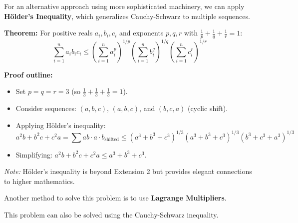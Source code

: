 \begin{remark}
For an alternative approach using more sophisticated machinery, we can apply \textbf{H\"older's Inequality}, which generalizes Cauchy-Schwarz to multiple sequences.

\textbf{Theorem:} For positive reals $a_i, b_i, c_i$ and exponents $p, q, r$ with $\frac{1}{p} + \frac{1}{q} + \frac{1}{r} = 1$:
\[
\sum_{i=1}^n a_i b_i c_i \le \left(\sum_{i=1}^n a_i^p\right)^{1/p} \left(\sum_{i=1}^n b_i^q\right)^{1/q} \left(\sum_{i=1}^n c_i^r\right)^{1/r}
\]


\textbf{Proof outline:}
\begin{itemize}
    \item Set $p = q = r = 3$ (so $\frac{1}{3} + \frac{1}{3} + \frac{1}{3} = 1$).
    \item Consider sequences: $(a, b, c)$, $(a, b, c)$, and $(b, c, a)$ (cyclic shift).
    \item Applying H\"older's inequality:
    \[
    a^2b + b^2c + c^2a = \sum ab \cdot a \cdot b_{\text{shifted}} \le (a^3+b^3+c^3)^{1/3} (a^3+b^3+c^3)^{1/3} (b^3+c^3+a^3)^{1/3}
    \]
    \item Simplifying: $a^2b + b^2c + c^2a \le a^3 + b^3 + c^3$.
\end{itemize}

\textit{Note:} H\"older's inequality is beyond Extension 2 but provides elegant connections to higher mathematics.
\end{remark}

\begin{remark}
Another method to solve this problem is to use \textbf{Lagrange Multipliers}.
\end{remark}

\begin{remark}
This problem can also be solved using the Cauchy-Schwarz inequality.
\end{remark}
